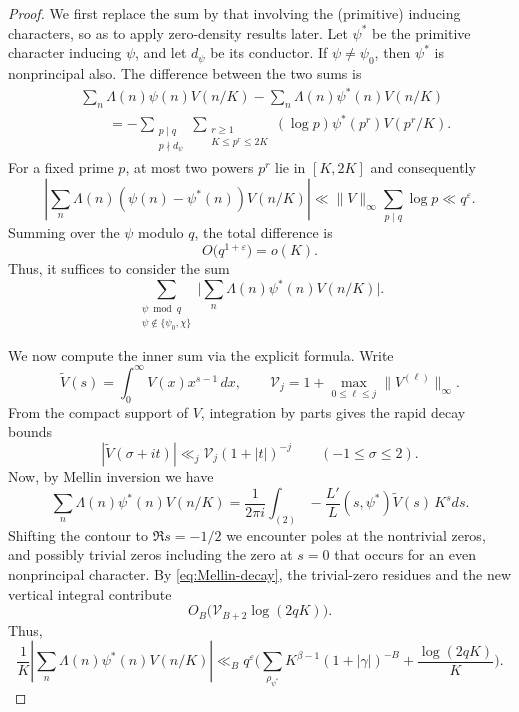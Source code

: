 \documentclass[10pt,a4paper]{amsart}
\newcommand{\eps}{\varepsilon}
\newcommand{\geqs}{\geqslant }
\newcommand{\leqs}{\leqslant }
\begin{document}
\begin{proof}
We first replace the sum by that involving the (primitive) inducing characters, so as to apply zero-density results later. Let $\psi^*$ be the primitive character inducing $\psi$, and let
$d_\psi$ be its conductor.  If $\psi\ne\psi_0$, then $\psi^*$ is nonprincipal also. 
The difference between the two sums is 
\begin{align*}
 &\sum_n\Lambda(n)\psi(n)V(n/K)
 -\sum_n\Lambda(n)\psi^*(n)V(n/K)\\
 &\qquad=-\sum_{\substack{p\mid q\\p\nmid d_\psi}}
 \sum_{\substack{r\geqs1\\K\leqs p^r\leqs 2K}}
 (\log p)\psi^*(p^r)V(p^r/K).
\end{align*}
For a fixed prime $p$, at most two powers $p^r$ lie in $[K,2K]$ and consequently
\[
 \left|\sum_n\Lambda(n)
       (\psi(n)-\psi^*(n))V(n/K)\right|
 \ll \|V\|_\infty\sum_{p\mid q}\log p
 \ll q^{\eps}.
\]
Summing over the $\psi$ modulo $q$, the total difference is
\begin{equation*}
 O\bigl(q^{1+\eps}\bigr)=o(K).
\end{equation*}
Thus, it suffices to consider the sum
\[
 \sum_{\substack{\psi\bmod q\\\psi\notin\{\psi_0,\chi\}}}
\bigg|\sum_n\Lambda(n)\psi^*(n)V(n/K)\bigg|.
\]


We now compute the inner sum via the explicit formula. Write
\[
 \widetilde V(s)=\int_0^\infty V(x)x^{s-1}\,dx,
 \qquad
 \mathcal V_j=1+\max_{0\leqs \ell\leqs j}
                    \|V^{(\ell)}\|_\infty.
\]
From the compact support of $V$, integration by parts gives the rapid decay bounds
\begin{equation}
 |\widetilde V(\sigma+it)|
 \ll_j \mathcal V_j(1+|t|)^{-j}
 \qquad (-1\leqs\sigma\leqs2).
 \label{eq:Mellin-decay}
\end{equation}
Now, by Mellin inversion we have 
\begin{equation}
 \sum_n\Lambda(n)\psi^*(n)V(n/K)
 =\frac{1}{2\pi i}\int_{(2)}
   -\frac{L'}{L}(s,\psi^*)\widetilde V(s)\,K^sds.
 \label{eq:prime-Mellin-inversion}
\end{equation}
Shifting the contour to $\Re s=-1/2$ we encounter poles at the nontrivial zeros,
and possibly trivial zeros including the zero
at $s=0$ that occurs for an even nonprincipal character.  By
\eqref{eq:Mellin-decay}, the trivial-zero residues and the new vertical
integral contribute
\[
 O_B\bigl(\mathcal V_{B+2}\log(2qK)\bigr).
\]
Thus,
\begin{equation}
 \frac1K\left|\sum_n\Lambda(n)\psi^*(n)V(n/K)\right|
 \ll_B q^\eps
 \bigg(\sum_{\rho_{\psi^*}}
 K^{\beta-1}(1+|\gamma|)^{-B}
 +\frac{\log(2qK)}K\bigg).
 \label{eq:prime-explicit}
\end{equation}


\end{proof}
\end{document}
